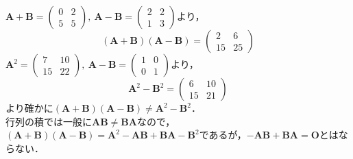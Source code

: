 \begin{ans}
$\bm{A}+\bm{B}=\begin{pmatrix}0 & 2 \\ 5 & 5\end{pmatrix},\ \bm{A}-\bm{B}=\begin{pmatrix}2 & 2 \\ 1 & 3\end{pmatrix}$より，
\[(\bm{A}+\bm{B})(\bm{A}-\bm{B})=\begin{pmatrix}2 & 6 \\ 15 & 25\end{pmatrix}\]
$\bm{A}^2=\begin{pmatrix}7 & 10 \\ 15 & 22\end{pmatrix},\ \bm{A}-\bm{B}=\begin{pmatrix}1 & 0 \\ 0 & 1\end{pmatrix}$より，
\[\bm{A}^2-\bm{B}^2=\begin{pmatrix}6 & 10 \\ 15 & 21\end{pmatrix}\]
より確かに$(\bm{A}+\bm{B})(\bm{A}-\bm{B})\neq\bm{A}^2-\bm{B}^2$．\\
行列の積では一般に$\bm{A}\bm{B}\neq\bm{B}\bm{A}$なので，$(\bm{A}+\bm{B})(\bm{A}-\bm{B})=\bm{A}^2-\bm{A}\bm{B}+\bm{B}\bm{A}-\bm{B}^2$であるが，$-\bm{A}\bm{B}+\bm{B}\bm{A}=\bm{O}$とはならない．
\end{ans}

